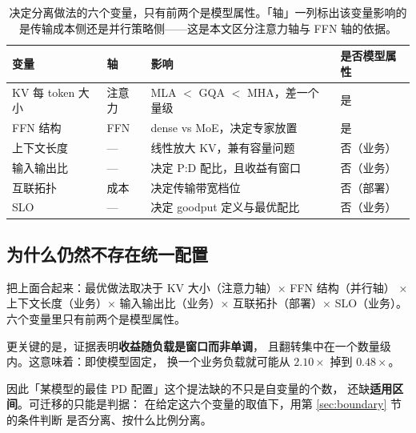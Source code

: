\begin{table}[t]
\centering
\caption{决定分离做法的六个变量，只有前两个是模型属性。「轴」一列标出该变量影响的是传输成本侧还是并行策略侧——这是本文区分注意力轴与 FFN 轴的依据。}
\label{tab:model-vars}
\small
\begin{tabular}{@{}p{1.55cm}p{0.85cm}p{2.35cm}p{1.55cm}@{}}
\toprule
变量 & 轴 & 影响 & 是否模型属性 \\
\midrule
KV 每 token 大小 & 注意力 & MLA $<$ GQA $<$ MHA，差一个量级 & 是 \\
FFN 结构 & FFN & dense vs MoE，决定专家放置 & 是 \\
上下文长度 & --- & 线性放大 KV，兼有容量问题 & 否（业务） \\
输入输出比 & --- & 决定 P:D 配比，且收益有窗口 & 否（业务） \\
互联拓扑 & 成本 & 决定传输带宽档位 & 否（部署） \\
SLO & --- & 决定 goodput 定义与最优配比 & 否（业务） \\
\bottomrule
\end{tabular}
\end{table}

\subsection{为什么仍然不存在统一配置}

把上面合起来：最优做法取决于 KV 大小（注意力轴）× FFN 结构（并行轴）
× 上下文长度（业务）× 输入输出比（业务）× 互联拓扑（部署）×
SLO（业务）。六个变量里只有前两个是模型属性。

更关键的是，证据表明\textbf{收益随负载是窗口而非单调}，
且翻转集中在一个数量级内。这意味着：即使模型固定，
换一个业务负载就可能从 $2.10\times$ 掉到 $0.48\times$。

因此「某模型的最佳 PD 配置」这个提法缺的不只是自变量的个数，
还缺\textbf{适用区间}。可迁移的只能是判据：
在给定这六个变量的取值下，用第 \ref{sec:boundary} 节的条件判断
是否分离、按什么比例分离。
